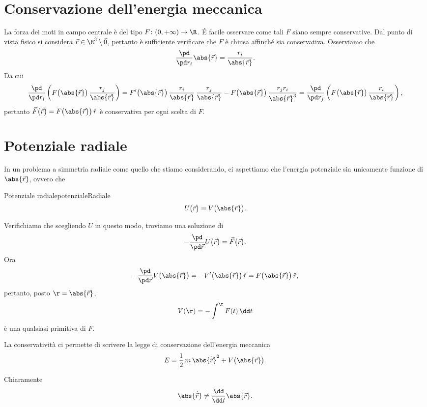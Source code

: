 \section{Conservazione dell'energia meccanica}

La forza dei moti in campo centrale è del tipo \(F\colon (0,+\infty) \to \R\).
\'E facile osservare come tali \(F\) siano sempre conservative.
Dal punto di vista fisico si considera \(\vec{r}\in \R^3\setminus{\vec{0}}\), pertanto è sufficiente verificare che \(F\) è chiusa affinché sia conservativa.
Osserviamo che
\[
	\frac{\pd}{\pd r_i} \abs{\vec{r}} = \frac{r_i}{\abs{\vec{r}}}.
\]
Da cui
\[
	\frac{\pd}{\pd r_i} \left( F\big(\abs{\vec{r}}\big)\, \frac{r_j}{\abs{\vec{r}}} \right) = F'\big(\abs{\vec{r}}\big)\,\frac{r_i}{\abs{\vec{r}}}\,\frac{r_j}{\abs{\vec{r}}} - F\big(\abs{\vec{r}}\big)\, \frac{r_j r_i}{\abs{\vec{r}}^3} = \frac{\pd}{\pd r_j}\left( F\big(\abs{\vec{r}}\big)\, \frac{r_i}{\abs{\vec{r}}} \right),
\]
pertanto \(\vec{F}\big(\vec{r}\big) = F\big(\abs{\vec{r}}\big)\,\hat{r}\) è conservativa per ogni scelta di \(F\).

\section{Potenziale radiale}

In un problema a simmetria radiale come quello che stiamo considerando, ci aspettiamo che l'energia potenziale sia unicamente funzione di \(\abs{\vec{r}}\), ovvero che

\begin{remark}{Potenziale radiale}{potenzialeRadiale}
	\[
		U\big(\vec{r}\big) = V\big(\abs{\vec{r}}\big).
	\]
\end{remark}
\noindent
Verifichiamo che scegliendo \(U\) in questo modo, troviamo una soluzione di
\[
	-\frac{\pd}{\pd\vec{r}}U\big(\vec{r}\big) = \vec{F}\big(\vec{r}\big).
\]
Ora 
\[
	-\frac{\pd}{\pd\vec{r}}V\big(\abs{\vec{r}}\big) = -V'\big(\abs{\vec{r}}\big)\,\hat{r} = F\big(\abs{\vec{r}}\big)\,\hat{r},
\]
pertanto, posto \(\r = \abs{\vec{r}}\),
\[
	V(\r) = -\int^\r F(t)\,\dd t
\]
è una qualsiasi primitiva di \(F\).

La conservatività ci permette di scrivere la legge di conservazione dell'energia meccanica
\[
	E = \frac{1}{2}\,m\,\abs{\dot{\vec{r}}}^2 + V\big(\abs{\vec{r}}\big).
\]

\begin{oss}
	Chiaramente
	\[
		\abs{\dot{\vec{r}}} \neq \frac{\dd}{\dd t} \abs{\vec{r}}.
	\]
\end{oss}

